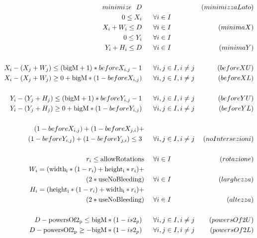 \begin{align*}	%
%
%
minimize \ \ D       \ \ \ \ \   &   & \eqname{(minimizzaLato)} \\	%
%
0 \leq X_i           \ \ \ \ \   & \fori{} \\
X_i +W_i \leq D      \ \ \ \ \   & \fori{} & \eqname{(minimaX)} \\ %
0 \leq Y_i           \ \ \ \ \   & \fori{} \\
Y_i +H_i \leq D      \ \ \ \ \   & \fori{} & \eqname{(minimaY)} \\
\\
%
%
X_i - (X_j + W_j) \leq (\text{bigM}+1) *beforeX_{i,j} -1           \ \ \ \ \   &\forij{} &\eqname{(beforeXU)} \\
X_i - (X_j + W_j) \geq 0 + \text{bigM}*(1-beforeX_{i,j})       \ \ \ \ \   &\forij{} &\eqname{(beforeXL)} \\ \\
%
%
Y_i - (Y_j + H_j) \leq (\text{bigM}+1)*beforeY_{i,j} -1           \ \ \ \ \   &\forij{} &\eqname{(beforeYU)} \\
Y_i - (Y_j + H_j) \geq 0 + \text{bigM}*(1-beforeY_{i,j})       \ \ \ \ \   &\forij{} &\eqname{(beforeYL)} \\ \\
%
%
(1-beforeX_{i,j})+(1-beforeX_{j,i})+ \ \ \ \ & \\
(1-beforeY_{i,j})+(1-beforeY_{j,i}) \leq 3       \ \ \ \ \   & \forij{} & \eqname{(noIntersezioni)} \\ \\
%
%
r_i \leq \text{allowRotations} \ \ \ \ & \fori{} &\eqname{(rotazione)} \\
%
W_i = (\text{\widthi}*(1-r_i) + \text{\heighti}*r_i)+ \ \ \ \ & &\\
(2*\text{useNoBleeding}) \ \ \ \ & \fori{} &\eqname{(larghezza)} \\
%
H_i = (\text{\heighti}*(1-r_i) + \text{\widthi}*r_i)+ \ \ \ \ & &\\
(2*\text{useNoBleeding}) \ \ \ \ & \fori{} &\eqname{(altezza)} \\
%
%
\\
D-\text{powersOf2\textsubscript{p}} \leq \text{bigM}*(1-is2_p)       \ \ \ \ \   & \forij{} & \eqname{(powersOf2U)} \\
D-\text{powersOf2\textsubscript{p}} \geq -\text{bigM}*(1-is2_p)       \ \ \ \ \   & \forij{} & \eqname{(powersOf2L)} \\

\end{align*}
